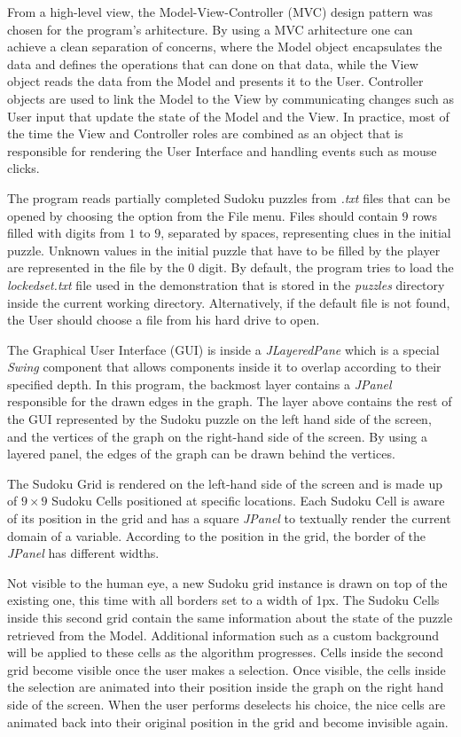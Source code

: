 \documentclass{l4proj}
\begin{document}
\noindent From a high-level view, the Model-View-Controller (MVC) design pattern was chosen for the program's arhitecture. By using a MVC arhitecture one can achieve a clean separation of concerns, where the Model object encapsulates the data and defines the operations that can done on that data, while the View object reads the data from the Model and presents it to the User. Controller objects are used to link the Model to the View by communicating changes such as User input that update the state of the Model and the View. In practice, most of the time the View and Controller roles are combined as an object that is responsible for rendering the User Interface and handling events such as mouse clicks.

\noindent The program reads partially completed Sudoku puzzles from \textit{.txt} files that can be opened by choosing the option from the File menu. Files should contain $9$ rows filled with digits from $1$ to $9$, separated by spaces, representing clues in the initial puzzle. Unknown values in the initial puzzle that have to be filled by the player are represented in the file by the $0$ digit. By default, the program tries to load the \textit{lockedset.txt} file used in the demonstration that is stored in the \textit{puzzles} directory inside the current working directory. Alternatively, if the default file is not found, the User should choose a file from his hard drive to open.

\noindent The Graphical User Interface (GUI) is inside a \textit{JLayeredPane} which is a special \textit{Swing} component that allows components inside it to overlap according to their specified depth. In this program, the backmost layer contains a \textit{JPanel} responsible for the drawn edges in the graph. The layer above contains the rest of the GUI represented by the Sudoku puzzle on the left hand side of the screen, and the vertices of the graph on the right-hand side of the screen. By using a layered panel, the edges of the graph can be drawn behind the vertices.

\noindent The Sudoku Grid is rendered on the left-hand side of the screen and is made up of $9 \times 9$ Sudoku Cells positioned at specific locations. Each Sudoku Cell is aware of its position in the grid and has a square \textit{JPanel} to textually render the current domain of a variable. According to the position in the grid, the border of the \textit{JPanel} has different widths.

\noindent Not visible to the human eye, a new Sudoku grid instance is drawn on top of the existing one, this time with all borders set to a width of 1px. The Sudoku Cells inside this second grid contain the same information about the state of the puzzle retrieved from the Model. Additional information such as a custom background will be applied to these cells as the algorithm progresses. Cells inside the second grid become visible once the user makes a selection. Once visible, the cells inside the selection are animated into their position inside the graph on the right hand side of the screen. When the user performs deselects his choice, the nice cells are animated back into their original position in the grid and become invisible again.
\end{document}
